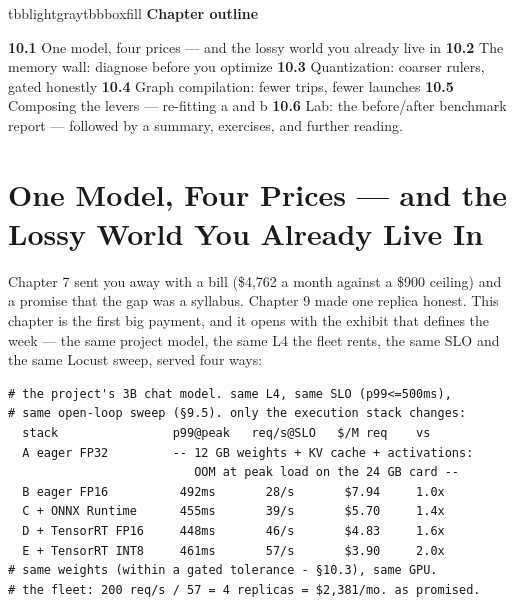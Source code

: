 \vspace{3.5pt}

\begin{calloutbox}{tbblightgray}{tbbboxfill}
{\normalsize\bfseries\color{tbbink}Chapter outline}\par\vspace{3pt}
\textbf{10.1} One model, four prices — and the lossy world you already live in    \textbf{10.2} The memory wall: diagnose before you optimize    \textbf{10.3} Quantization: coarser rulers, gated honestly    \textbf{10.4} Graph compilation: fewer trips, fewer launches    \textbf{10.5} Composing the levers — re-fitting a and b    \textbf{10.6} Lab: the before/after benchmark report — followed by a summary, exercises, and further reading.
\end{calloutbox}

\section{One Model, Four Prices — and the Lossy World You Already Live In}

Chapter 7 sent you away with a bill (\$4,762 a month against a \$900 ceiling) and a promise that the gap was a syllabus. Chapter 9 made one replica honest. This chapter is the first big payment, and it opens with the exhibit that defines the week — the same project model, the same L4 the fleet rents, the same SLO and the same Locust sweep, served four ways:

\begin{terminalbox}
\begin{Verbatim}[breaklines=true,breakanywhere=true,fontsize=\small,formatcom=\color{tbbtermfg},codes=\tbbcodeactive]
# the project's 3B chat model. same L4, same SLO (p99<=500ms),
# same open-loop sweep (§9.5). only the execution stack changes:
  stack                p99@peak   req/s@SLO   $/M req    vs
  A eager FP32         -- 12 GB weights + KV cache + activations:
                          OOM at peak load on the 24 GB card --
  B eager FP16          492ms       28/s       $7.94     1.0x
  C + ONNX Runtime      455ms       39/s       $5.70     1.4x
  D + TensorRT FP16     448ms       46/s       $4.83     1.6x
  E + TensorRT INT8     461ms       57/s       $3.90     2.0x
# same weights (within a gated tolerance - §10.3), same GPU.
# the fleet: 200 req/s / 57 = 4 replicas = $2,381/mo. as promised.
\end{Verbatim}
\end{terminalbox}

